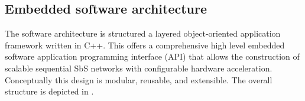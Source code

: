 \subsection{\textbf{Embedded software architecture}}
The software architecture is structured a layered object-oriented application framework written in C++. This offers a comprehensive high level embedded software application programming interface (API) that allows the construction of scalable sequential SbS networks with configurable hardware acceleration. Conceptually this design is modular, reusable, and extensible. The overall structure is depicted in .

